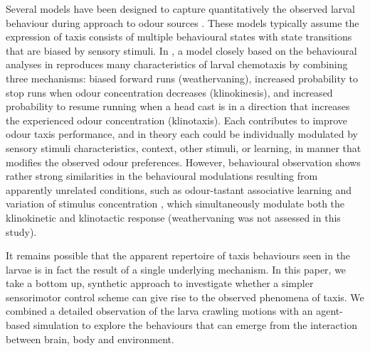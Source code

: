 \documentclass[11pt,a4paper]{article}
\newcommand{\todoBW}[1]{\todo[author=BW,color=orange, size=\tiny,inline]{#1}}
\begin{document}
Several models have been designed to capture quantitatively the observed larval behaviour during approach to odour sources  \citep{davies2015model,hernandez2015reverse,schleyer2015learning,gepner2015computations}. These models typically assume the expression of taxis consists of multiple behavioural states with state transitions that are biased by sensory stimuli. In \cite{davies2015model}, a model closely based on the behavioural analyses in
 \citet{lahiri2011two,gomez2014multilevel,gomez2011active} reproduces many characteristics of larval chemotaxis by combining three mechanisms: biased forward runs (weathervaning), increased probability to stop runs when odour concentration decreases (klinokinesis), and increased probability to resume running when a head cast is in a direction that increases the experienced odour concentration (klinotaxis). Each contributes to improve odour taxis performance, and in theory each could be individually modulated by sensory stimuli characteristics, context, other stimuli, or learning, in manner that modifies the observed odour preferences. 
However, behavioural observation shows rather strong similarities in the behavioural modulations resulting from apparently unrelated conditions, such as odour-tastant associative learning and variation of stimulus concentration \citep{schleyer2015learning}, which simultaneously modulate both the klinokinetic and klinotactic response (weathervaning was not assessed in this study).

It remains possible that the apparent repertoire of taxis behaviours seen in the larvae is in fact the result of a single underlying mechanism. In this paper, we take a bottom up, synthetic approach \citep{braitenberg1986vehicles} to investigate whether a simpler sensorimotor control scheme can give rise to the observed phenomena of taxis. We combined a detailed observation of the larva crawling motions with an agent-based simulation to explore the behaviours that can emerge from the interaction between brain, body and environment.
\end{document}
